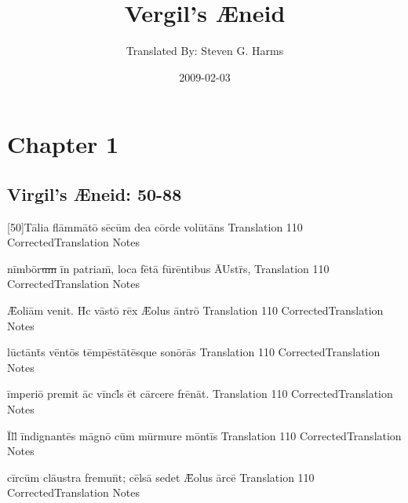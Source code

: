 \documentclass[]{book}
\title{Vergil's {\AE}neid}
\author{ Translated By:  Steven G. Harms }
\date{2009-02-03}
\begin{document}

\ifpdf
{}
\else
{}
\fi

\enumstyle 

\maketitle
\tableofcontents

\chapter{Chapter 1}
%
%
%

\newpage
\section{Virgil's {\AE}neid:  50-88} %

\latline
  {[50]T\={\macron a}l\-i\-a fl\=amm\={\macron a}t\={\macron o} s\={\macron e}c\=um d\-e\-a c\=ord\-e v\-ol\={\macron u}t\={\macron a}ns
}
  { Translation }
  {110}
  { CorrectedTranslation }
  { Notes }


\latline
  {n\=imb\={\macron o}r\sout{um }\=in p\-atr\-ia\=m, l\-oc\-a f\={\macron e}t\=a f\=ur\=ent\-ib\-us \={AU}str\={\macron {\i}}s,}
  { Translation }
  {110}
  { CorrectedTranslation }
  { Notes }


\latline
  {\={\AE}\-ol\-i\=am v\-en\-it.  H\={\macron {\i}}c v\=ast\={\macron o} r\={\macron e}x \={\AE}\-ol\-us \=antr\={\macron o}}
  { Translation }
  {110}
  { CorrectedTranslation }
  { Notes }

\newpage

\latline
  {l\=uct\=ant\={\macron {\i}}s v\=ent\={\macron o}s t\=emp\=est\={\macron a}t\={\macron e}squ\-e s\-on\={\macron o}r\={\macron a}s
}
  { Translation }
  {110}
  { CorrectedTranslation }
  { Notes }


\latline
  {\=imp\-er\-i\={\macron o} pr\-em\-it \=ac v\=incl\={\macron {\i}}s \=et c\=arc\-er\-e fr\={\macron e}n\=at.
}
  { Translation }
  {110}
  { CorrectedTranslation }
  { Notes }


\latline
  {\=Ill\={\macron {\i}} \=ind\-ign\-ant\={\macron e}s m\=agn\={\macron o} c\=um m\=urm\-ur\-e m\=ont\=is
}
  { Translation }
  {110}
  { CorrectedTranslation }
  { Notes }

\newpage
\latline
  {c\=irc\=um cl\={au}str\-a fr\-emu\=nt; c\=els\={\macron a} s\-ed\-et \={\AE}\-ol\-us \=arc\=e
}
  { Translation }
  {110}
  { CorrectedTranslation }
  { Notes }
\end{document}
